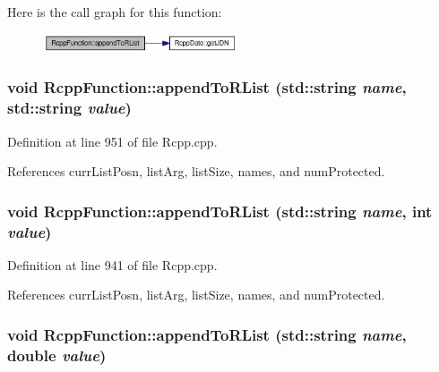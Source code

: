 Here is the call graph for this function:\nopagebreak
\begin{figure}[H]
\begin{center}
\leavevmode
\includegraphics[width=163pt]{classRcppFunction_9aab0b3accb81d90fb813acf3bf4c49d_cgraph}
\end{center}
\end{figure}
\hypertarget{classRcppFunction_861ba7ae5c09acf31a034472b5a47728}{
\subsubsection[{appendToRList}]{\setlength{\rightskip}{0pt plus 5cm}void RcppFunction::appendToRList (std::string {\em name}, \/  std::string {\em value})}}
\label{classRcppFunction_861ba7ae5c09acf31a034472b5a47728}




Definition at line 951 of file Rcpp.cpp.

References currListPosn, listArg, listSize, names, and numProtected.\hypertarget{classRcppFunction_fce449ac5d89b32e0e0b9f584278a672}{
\subsubsection[{appendToRList}]{\setlength{\rightskip}{0pt plus 5cm}void RcppFunction::appendToRList (std::string {\em name}, \/  int {\em value})}}
\label{classRcppFunction_fce449ac5d89b32e0e0b9f584278a672}




Definition at line 941 of file Rcpp.cpp.

References currListPosn, listArg, listSize, names, and numProtected.\hypertarget{classRcppFunction_0df1a8ff093e21a2a7c6fc80d6645c7e}{
\subsubsection[{appendToRList}]{\setlength{\rightskip}{0pt plus 5cm}void RcppFunction::appendToRList (std::string {\em name}, \/  double {\em value})}}
\label{classRcppFunction_0df1a8ff093e21a2a7c6fc80d6645c7e}




